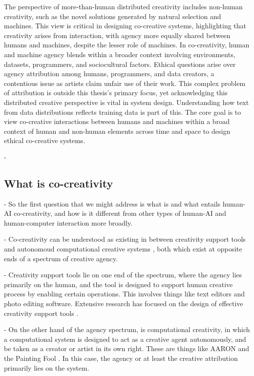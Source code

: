 The perspective of more-than-human distributed creativity includes non-human creativity, such as the novel solutions generated by natural selection and machines. This view is critical in designing co-creative systems, highlighting that creativity arises from interaction, with agency more equally shared between humans and machines, despite the lesser role of machines. In co-creativity, human and machine agency blends within a broader context involving environments, datasets, programmers, and sociocultural factors. Ethical questions arise over agency attribution among humans, programmers, and data creators, a contentious issue as artists claim unfair use of their work. This complex problem of attribution is outside this thesis's primary focus, yet acknowledging this distributed creative perspective is vital in system design. Understanding how text from data distributions reflects training data is part of this. The core goal is to view co-creative interactions between humans and machines within a broad context of human and non-human elements across time and space to design ethical co-creative systems.


- 




\subsection{What is co-creativity}

- So the first question that we might address is what is and what entails human-AI co-creativity, and how is it different from other types of human-AI and human-computer interaction more broadly.

- Co-creativity can be understood as existing in between creativity support tools and autonomoud computational creative systems \cite{Kantosalo2019-pz, Deterding2017-wh}, both which exist at opposite ends of a spectrum of creative agency. 

- Creativity support tools lie on one end of the spectrum, where the agency lies primarily on the human, and the tool is designed to support human creative process by enabling certain operations. This involves things like text editors and photo editing software. Extensive research has focused on the design of effective creativity support tools \cite{Shneiderman2006-di, Shneiderman2007-yh, Cherry2014-ty, Chung2021-kc, Resnick2005-fs}. 
 
 - On the other hand of the agency spectrum, is computational creativity, in which a computational system is designed to act as a creative agent autonomously, and be taken as a creator or artist in its own right. These are things like AARON \cite{Cohen1995-wt} and the Painting Fool \cite{Colton2015-qr}. In this case, the agency or at least the creative attribution primarily lies on the system. 

